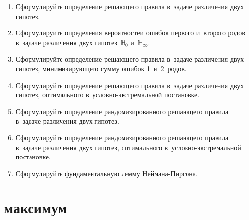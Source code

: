 \documentclass[a4paper,12pt]{extreport}
\renewcommand{\=}[1]{\stackrel{#1}{=}} %
\begin{document}
\begin{enumerate}
    \item Сформулируйте определение решающего правила
    в~задаче различения двух гипотез.

    \item Сформулируйте определения вероятностей ошибок
    первого и~второго родов в~задаче различения двух гипотез~$\mathbb{H}_0$
    и~$\mathbb{H}_{\infty}$.

    \item Сформулируйте определение решающего правила в~задаче
    различения двух гипотез, минимизирующего сумму ошибок
    1~и~2~родов.

    \item Сформулируйте определение решающего правила
    в~задаче различения двух гипотез, оптимального
    в~условно-экстремальной постановке.

    \item Сформулируйте определение рандомизированного 
    решающего правила в~задаче различения двух гипотез.
    
    \item Сформулируйте определение рандомизированного решающего правила
    в~задаче различения двух гипотез, оптимального
    в~условно-экстремальной постановке.

    \item Сформулируйте фундаментальную лемму Неймана-Пирсона.

\end{enumerate}

\newpage

\section*{ максимум}
\end{document}
